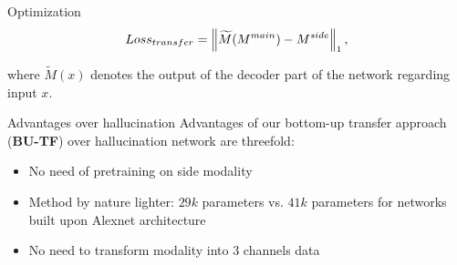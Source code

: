 \begin{frame}{Optimization}
	\begin{equation}
			Loss_{transfer} = \left\lVert\widetilde{M}(M^{main}) - M^{side}\right\rVert_1,
	\end{equation}
	
	where $\widetilde{M}(x)$ denotes the output of the decoder part of the network regarding input $x$.
	
	
	
\end{frame}

\begin{frame}{Advantages over hallucination}
	Advantages of our bottom-up transfer approach (\textbf{BU-TF}) over hallucination network are threefold: 
	\begin{itemize}
		\item<1-> No need of pretraining on side modality
		\item<2-> Method by nature lighter: $29k$ parameters vs. $41k$ parameters for networks built upon Alexnet architecture
		\item<3> No need to transform modality into 3 channels data
	\end{itemize}
	

\end{frame}